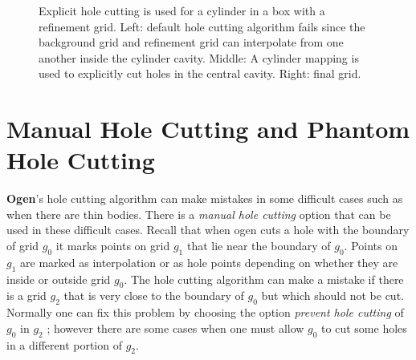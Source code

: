 \documentclass[xcolor=rgb,svgnames,dvipsnames]{article}
\newcommand{\figures}{../fig}
\begin{document}
{
\newcommand{\figWidtha}{5cm}
\newcommand{\trimfiga}[2]{\trimPlot{#1}{#2}{.05}{.05}{.05}{.075}}
% 
\newcommand{\figWidthd}{6cm}
\newcommand{\trimfig}[2]{\trimPlot{#1}{#2}{.05}{.075}{.075}{.07}}
\begin{figure}[hbt]
\begin{center}
\end{center}
  \caption{Explicit hole cutting is used for a cylinder in a box with a refinement grid. Left: default hole cutting algorithm
      fails since the background grid and refinement grid can interpolate from one another inside the cylinder cavity. 
    Middle: A cylinder mapping is used to explicitly cut holes in the central cavity. Right: final grid.} 
 \label{fig:explicitHoleCuttingCylInBox}
\end{figure}
}




\clearpage
\section{Manual Hole Cutting and Phantom Hole Cutting}


  {\bf Ogen}'s hole cutting algorithm can make mistakes in some difficult cases such as when
there are thin bodies. There is a {\em manual hole cutting} option that can be used
in these difficult cases. Recall that when ogen cuts a hole with the boundary of grid $g_0$
it marks points on grid $g_1$ that lie near the boundary of $g_0$. Points on $g_1$ are marked as
interpolation or as hole points depending on whether they are inside or outside grid $g_0$.
The hole cutting algorithm can make a mistake if there is a grid $g_2$ that is very close to the 
boundary of $g_0$ but which should not be cut. Normally one can fix this problem by
choosing the option {\em prevent hole cutting} of $g_0$ in $g_2$ ; however there are some cases
when one must allow $g_0$ to cut some holes in a different portion of $g_2$.
\end{document}
